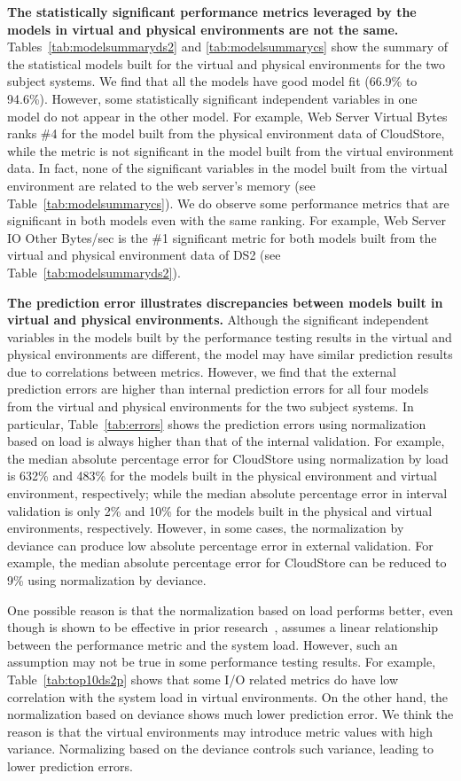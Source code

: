 \noindent \textbf{The statistically significant performance metrics leveraged by the models in virtual and physical environments are not the same.} Tables~\ref{tab:modelsummaryds2} and \ref{tab:modelsummarycs} show the summary of the statistical models built for the virtual and physical environments for the two subject systems. We find that all the models have good model fit (66.9\% to 94.6\%). However, some statistically significant independent variables in one model do not appear in the other model. For example, Web Server Virtual Bytes ranks \#4 for the model built from the physical environment data of CloudStore, while the metric is not significant in the model built from the virtual environment data. In fact, none of the significant variables in the model built from the virtual environment are related to the web server's memory (see Table~\ref{tab:modelsummarycs}). We do observe some performance metrics that are significant in both models even with the same ranking. For example, Web Server IO Other Bytes/sec is the \#1 significant metric for both models built from the virtual and physical environment data of DS2 (see Table~\ref{tab:modelsummaryds2}). 

\noindent \textbf{The prediction error illustrates discrepancies between models built in virtual and physical environments.} Although the significant independent variables in the models built by the performance testing results in the virtual and physical environments are different, the model may have similar prediction results due to correlations between metrics. However, we find that the external prediction errors are higher than internal prediction errors for all four models from the virtual and physical environments for the two subject systems. In particular, Table~\ref{tab:errors} shows the prediction errors using normalization based on load is always higher than that of the internal validation. For example, the median absolute percentage error for CloudStore using normalization by load is 632\% and 483\% for the models built in the physical environment and virtual environment, respectively; while the median absolute percentage error in interval validation is only 2\% and 10\% for the models built in the physical and virtual environments, respectively. However, in some cases, the normalization by deviance can produce low absolute percentage error in external validation. For example, the median absolute percentage error for CloudStore can be reduced to 9\% using normalization by deviance. 

One possible reason is that the normalization based on load performs better, even though is shown to be effective in prior research~\cite{Nguyen:2012:ADP:2188286.2188344}, assumes a linear relationship between the performance metric and the system load. However, such an assumption may not be true in some performance testing results. For example, Table~\ref{tab:top10ds2p} shows that some I/O related metrics do have low correlation with the system load in virtual environments. On the other hand, the normalization based on deviance shows much lower prediction error. We think the reason is that the virtual environments may introduce metric values with high variance. Normalizing based on the deviance controls such variance, leading to lower prediction errors.

